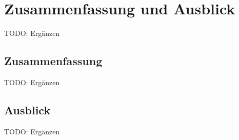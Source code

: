 \chapter{Zusammenfassung und Ausblick}
TODO: Ergänzen

\section{Zusammenfassung}
TODO: Ergänzen

\section{Ausblick}
TODO: Ergänzen


